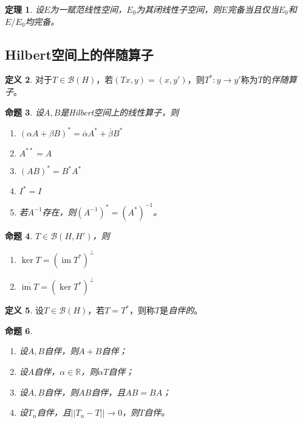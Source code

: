 \documentclass[winfonts,UTF8,c5size,a4paper,fancyhdr,hyperref,titlepage,nocap]{ctexart}
\theoremstyle{question}
\theoremstyle{theorem}
\newtheorem{thm}{定理}
\newtheorem{prop}[thm]{命题}
\theoremstyle{definition}
\newtheorem{defn}[thm]{定义}
\theoremstyle{remark}
\numberwithin{equation}{subsection}
\newcommand{\Real}{\mathbb{R}}
\newcommand{\red}{\color{red}}
\newcommand{\im}{\operatorname{im}}
\begin{document}
\begin{thm}
设$E$为一赋范线性空间，$E_0$为其闭线性子空间，则$E$完备当且仅当$E_0$和$E/E_0$均完备。
\end{thm}

\subsection{Hilbert空间上的伴随算子}
\begin{defn}
  对于$T\in\mathcal{B}(H)$，若$(Tx,y)=(x,y')$，则$T^{\ast}\colon y\to y'$称为$T$的\emph{\red 伴随算子}。
\end{defn}
\begin{prop}
设$A,B$是Hilbert空间上的线性算子，则
\begin{enumerate}[1)]
    \setlength{\itemindent}{2ex}
    \item $(\alpha A+\beta B)^{\ast}=\overline{\alpha}A^{\ast}+\overline{\beta}B^{\ast}$
    \item $A^{\ast\ast}=A$
    \item $(AB)^{\ast}=B^{\ast}A^{\ast}$
    \item $I^{\ast}=I$
    \item 若$A^{-1}$存在，则$(A^{-1})^{\ast}=(A^{\ast})^{-1}$。
\end{enumerate}
\end{prop}

\begin{prop}
$T\in\mathcal{B}(H,H')$，则
\begin{enumerate}[1)]
    \setlength{\itemindent}{2ex}
    \item $\ker T=(\im T^{\ast})^{\bot}$
    \item $\overline{\im T}=(\ker T^{\ast})^{\bot}$
\end{enumerate}  
\end{prop}

\begin{defn}
设$T\in\mathcal{B}(H)$，若$T=T^{\ast}$，则称$T$是\emph{\red 自伴的}。
\end{defn}

\begin{prop}
\begin{enumerate}[1)]
    \setlength{\itemindent}{2ex}
    \item 设$A,B$自伴，则$A+B$自伴；
    \item 设$A$自伴，$\alpha\in\Real$，则$\alpha T$自伴；
    \item 设$A,B$自伴，则$AB$自伴，且$AB=BA$；
    \item 设$T_n$自伴，且$||T_n-T||\to0$，则$T$自伴。
\end{enumerate} 
\end{prop}
\end{document}
